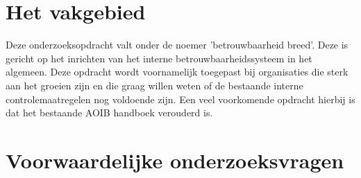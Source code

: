 \documentclass[10pt,a4paper,twoside]{report}
\begin{document}
\section{Het vakgebied}
Deze onderzoeksopdracht valt onder de noemer 'betrouwbaarheid breed'. Deze is gericht op het inrichten van het interne betrouwbaarheidssysteem in het algemeen. Deze opdracht wordt voornamelijk toegepast bij organisaties die sterk aan het groeien zijn en die graag willen weten of de bestaande interne controlemaatregelen nog voldoende zijn. Een veel voorkomende opdracht hierbij is dat het bestaande AOIB handboek verouderd is. \citep{bivpraktijk}


\newpage
\section{Voorwaardelijke onderzoeksvragen}
\end{document}
